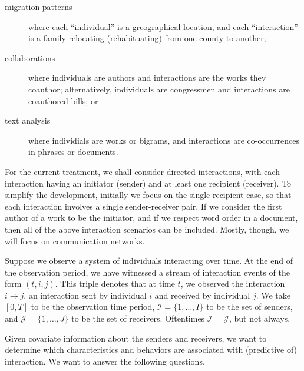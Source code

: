 \documentclass[aoas,preprint]{imsart}
\begin{document}
\begin{description}

    \item[migration patterns] where each ``individual'' is a greographical
    location, and each ``interaction'' is a family relocating (rehabituating)
    from one county to another;

    \item[collaborations] where individuals are authors and interactions are
    the works they coauthor; alternatively, individuals are congressmen and
    interactions are coauthored bills; or

    \item[text analysis] where individials are works or bigrams, and
    interactions are co-occurrences in phrases or documents.

\end{description}

For the current treatment, we shall consider directed interactions, with each
interaction having an initiator (sender) and at least one recipient
(receiver). To simplify the development, initially we focus on the
single-recipient case, so that each interaction involves a single
sender-receiver pair. If we consider the first author of a work to be the
initiator, and if we respect word order in a document, then all of the above
interaction scenarios can be included. Mostly, though, we will focus on
communication networks.

Suppose we observe a system of individuals interacting over time. At the end
of the observation period, we have witnessed a stream of interaction events of
the form $(t, i, j)$. This triple denotes that at time $t$, we observed the
interaction $i \to j$, an interaction sent by individual $i$ and received by
individual $j$. We take $[0,T]$ to be the observation time period,
$\mathcal{I} = \{1, \ldots, I \}$ to be the set of senders, and $\mathcal{J} =
\{1, \ldots, J \}$ to be the set of receivers. Oftentimes $\mathcal{I} =
\mathcal{J}$, but not always.

Given covariate information about the senders and receivers, we want to
determine which characteristics and behaviors are associated with (predictive
of) interaction. We want to answer the following questions.
\end{document}
